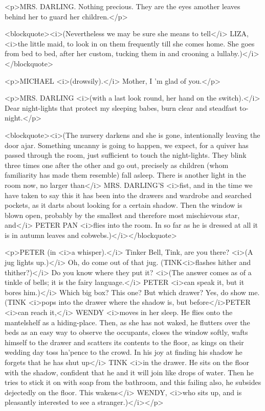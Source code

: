 <p>MRS. DARLING. Nothing precious. They are the eyes amother leaves
behind her to guard her children.</p>

<blockquote><i>(Nevertheless we may be sure she means to tell</i>
LIZA, <i>the little maid, to look in on them frequently till she
comes home. She goes from bed to bed, after her custom, tucking them
in and crooning a lullaby.)</i></blockquote>

<p>MICHAEL <i>(drowsily).</i> Mother, I 'm glad of you.</p>

<p>MRS. DARLING <i>(with a last look round, her hand on the
switch).</i> Dear night-lights that protect my sleeping babes, burn
clear and steadfast to-night.</p>

<blockquote><i>(The nursery darkens and she is gone, intentionally
leaving the door ajar. Something uncanny is going to happen, we
expect, for a quiver has passed through the room, just sufficient to
touch the night-lights. They blink three times one after the other
and go out, precisely as children (whom familiarity has made them
resemble) fall asleep. There is another light in the room now, no
larger than</i> MRS. DARLING'S <i>fist, and in the time we have taken
to say this it has been into the drawers and wardrobe and searched
pockets, as it darts about looking for a certain shadow. Then the
window is blown open, probably by the smallest and therefore most
mischievous star, and</i> PETER PAN <i>flies into the room. In so far
as he is dressed at all it is in autumn leaves and
cobwebs.)</i></blockquote>

<p>PETER (in <i>a whisper).</i> Tinker Bell, Tink, are you there?
<i>(A jug lights up.)</i> Oh, do come out of that jug.
(TINK<i>flashes hither and thither?)</i> Do you know where they put
it? <i>(The answer comes as of a tinkle of bells; it is the fairy
language.</i> PETER <i>can speak it, but it bores him.)</i> Which big
box? This one? But which drawer? Yes, do show me. (TINK <i>pops into
the drawer where the shadow is, but before</i>PETER <i>can reach
it,</i> WENDY <i>moves in her sleep. He flies onto the mantelshelf as
a hiding-place. Then, as she has not waked, he flutters over the beds
as an easy way to observe the occupants, closes the window softly,
wafts himself to the drawer and scatters its contents to the floor,
as kings on their wedding day toss ha'pence to the crowd. In his joy
at finding his shadow he forgets that he has shut up</i> TINK <i>in
the drawer. He sits on the floor with the shadow, confident that he
and it will join like drops of water. Then he tries to stick it on
with soap from the bathroom, and this failing also, he subsides
dejectedly on the floor. This wakens</i> WENDY, <i>who sits up, and
is pleasantly interested to see a stranger.)</i></p>

